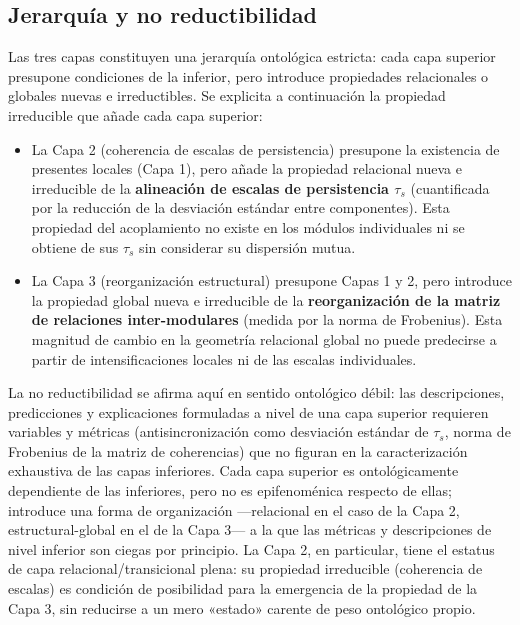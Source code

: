 \subsection{Jerarquía y no reductibilidad}

Las tres capas constituyen una jerarquía ontológica estricta: cada capa superior presupone condiciones de la inferior, pero introduce propiedades relacionales o globales nuevas e irreductibles. Se explicita a continuación la propiedad irreducible que añade cada capa superior:

\begin{itemize}
    \item La Capa 2 (coherencia de escalas de persistencia) presupone la existencia de presentes locales (Capa 1), pero añade la propiedad relacional nueva e irreducible de la \textbf{alineación de escalas de persistencia $\tau_s$} (cuantificada por la reducción de la desviación estándar entre componentes). Esta propiedad del acoplamiento no existe en los módulos individuales ni se obtiene de sus $\tau_s$ sin considerar su dispersión mutua.
    \item La Capa 3 (reorganización estructural) presupone Capas 1 y 2, pero introduce la propiedad global nueva e irreducible de la \textbf{reorganización de la matriz de relaciones inter-modulares} (medida por la norma de Frobenius). Esta magnitud de cambio en la geometría relacional global no puede predecirse a partir de intensificaciones locales ni de las escalas individuales.
\end{itemize}

La no reductibilidad se afirma aquí en sentido ontológico débil: las descripciones, predicciones y explicaciones formuladas a nivel de una capa superior requieren variables y métricas (antisincronización como desviación estándar de $\tau_s$, norma de Frobenius de la matriz de coherencias) que no figuran en la caracterización exhaustiva de las capas inferiores. Cada capa superior es ontológicamente dependiente de las inferiores, pero no es epifenoménica respecto de ellas; introduce una forma de organización —relacional en el caso de la Capa 2, estructural-global en el de la Capa 3— a la que las métricas y descripciones de nivel inferior son ciegas por principio. La Capa 2, en particular, tiene el estatus de capa relacional/transicional plena: su propiedad irreducible (coherencia de escalas) es condición de posibilidad para la emergencia de la propiedad de la Capa 3, sin reducirse a un mero «estado» carente de peso ontológico propio.

